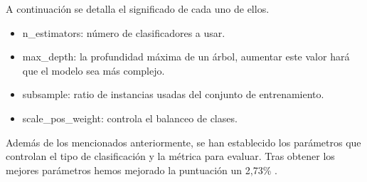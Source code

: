 A continuación se detalla el significado de cada uno de ellos.
\begin{itemize}
	\item n\_estimators: número de clasificadores a usar.
	\item max\_depth: la profundidad máxima de un árbol, aumentar este valor hará
	que el modelo sea más complejo.
	\item subsample: ratio de instancias usadas del conjunto de entrenamiento.
	\item  scale\_pos\_weight: controla el balanceo de clases.
\end{itemize}

Además de los mencionados anteriormente, se han establecido los parámetros que
controlan el tipo de clasificación y la métrica para evaluar.
Tras obtener los mejores parámetros hemos mejorado la puntuación un 2,73\% .
 
